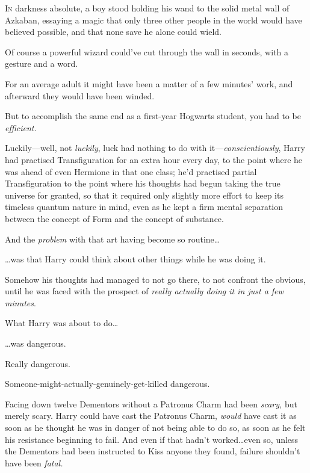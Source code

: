 

\lettrine{I}{n} darkness absolute, a boy stood holding his wand to the solid metal wall of Azkaban, essaying a magic that only three other people in the world would have believed possible, and that none save he alone could wield.

Of course a powerful wizard could’ve cut through the wall in seconds, with a gesture and a word.

For an average adult it might have been a matter of a few minutes’ work, and afterward they would have been winded.

But to accomplish the same end as a first-year Hogwarts student, you had to be \emph{efficient.}

Luckily—well, not \emph{luckily}, luck had nothing to do with
it—\emph{conscientiously}, Harry had practised Transfiguration for an extra hour every day, to the point where he was ahead of even Hermione in that one class; he’d practised partial Transfiguration to the point where his thoughts had begun taking the true universe for granted, so that it required only slightly more effort to keep its timeless quantum nature in mind, even as he kept a firm mental separation between the concept of Form and the concept of substance.

And the \emph{problem} with that art having become so routine…

…was that Harry could think about other things while he was doing it.

Somehow his thoughts had managed to not go there, to not confront the obvious, until he was faced with the prospect of \emph{really actually doing it in just a few minutes}.

What Harry was about to do…

…was dangerous.

Really dangerous.

Someone-might-actually-genuinely-get-killed dangerous.

Facing down twelve Dementors without a Patronus Charm had been \emph{scary,} but merely scary. Harry could have cast the Patronus Charm, \emph{would} have cast it as soon as he thought he was in danger of not being able to do so, as soon as he felt his resistance beginning to fail. And even if that hadn’t worked…even so, unless the Dementors had been instructed to Kiss anyone they found, failure shouldn’t have been \emph{fatal.}

